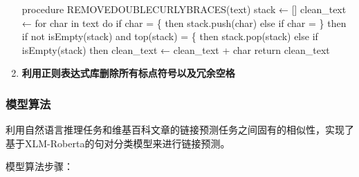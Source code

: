 \documentclass[
]{article}
\newenvironment{Shaded}{}{}
\newcommand{\NormalTok}[1]{#1}
\begin{document}
\begin{enumerate}
        \begin{Shaded}
          \begin{Highlighting}[]
            \NormalTok{procedure REMOVEDOUBLECURLYBRACES(text)}
            \NormalTok{	stack ← []}
            \NormalTok{	clean\_text ← \textquotesingle{}\textquotesingle{}}
            \NormalTok{	for char in text do}
            \NormalTok{		if char = \textquotesingle{}\{\textquotesingle{} then}
            \NormalTok{			stack.push(char)}
            \NormalTok{		else if char = \textquotesingle{}\}\textquotesingle{} then}
            \NormalTok{			if not isEmpty(stack) and}
            \NormalTok{				top(stack) = \textquotesingle{}\{\textquotesingle{} then}
            \NormalTok{				stack.pop(stack)}
            \NormalTok{		else}
            \NormalTok{			if isEmpty(stack) then}
            \NormalTok{				clean\_text ← clean\_text + char}
            \NormalTok{	return clean\_text}
          \end{Highlighting}
        \end{Shaded}
  \item
        \textbf{利用正则表达式库删除所有标点符号以及冗余空格}
\end{enumerate}

\subsubsection{模型算法}\label{ux6a21ux578bux7b97ux6cd5}

利用自然语言推理任务和维基百科文章的链接预测任务之间固有的相似性，实现了基于XLM-Roberta的句对分类模型来进行链接预测。

模型算法步骤：
\end{document}
